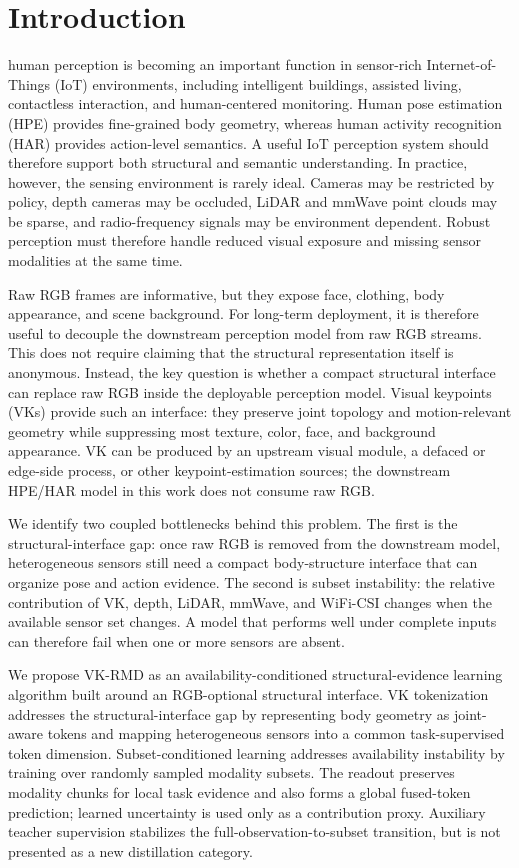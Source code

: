 ﻿\documentclass[journal]{IEEEtran}
\newcommand{\method}{VK-RMD}
\begin{document}
\section{Introduction}
 human perception is becoming an important function in sensor-rich Internet-of-Things (IoT) environments, including intelligent buildings, assisted living, contactless interaction, and human-centered monitoring. Human pose estimation (HPE) provides fine-grained body geometry, whereas human activity recognition (HAR) provides action-level semantics. A useful IoT perception system should therefore support both structural and semantic understanding. In practice, however, the sensing environment is rarely ideal. Cameras may be restricted by policy, depth cameras may be occluded, LiDAR and mmWave point clouds may be sparse, and radio-frequency signals may be environment dependent. Robust perception must therefore handle reduced visual exposure and missing sensor modalities at the same time.

Raw RGB frames are informative, but they expose face, clothing, body appearance, and scene background. For long-term deployment, it is therefore useful to decouple the downstream perception model from raw RGB streams. This does not require claiming that the structural representation itself is anonymous. Instead, the key question is whether a compact structural interface can replace raw RGB inside the deployable perception model. Visual keypoints (VKs) provide such an interface: they preserve joint topology and motion-relevant geometry while suppressing most texture, color, face, and background appearance. VK can be produced by an upstream visual module, a defaced or edge-side process, or other keypoint-estimation sources; the downstream HPE/HAR model in this work does not consume raw RGB.

We identify two coupled bottlenecks behind this problem. The first is the structural-interface gap: once raw RGB is removed from the downstream model, heterogeneous sensors still need a compact body-structure interface that can organize pose and action evidence. The second is subset instability: the relative contribution of VK, depth, LiDAR, mmWave, and WiFi-CSI changes when the available sensor set changes. A model that performs well under complete inputs can therefore fail when one or more sensors are absent.

We propose \method{} as an availability-conditioned structural-evidence learning algorithm built around an RGB-optional structural interface. VK tokenization addresses the structural-interface gap by representing body geometry as joint-aware tokens and mapping heterogeneous sensors into a common task-supervised token dimension. Subset-conditioned learning addresses availability instability by training over randomly sampled modality subsets. The readout preserves modality chunks for local task evidence and also forms a global fused-token prediction; learned uncertainty is used only as a contribution proxy. Auxiliary teacher supervision stabilizes the full-observation-to-subset transition, but is not presented as a new distillation category.
\end{document}
